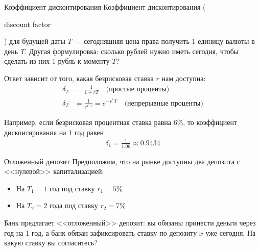 \documentclass{beamer}
\newcommand{\en}[1]{\begin{otherlanguage}{english}#1\end{otherlanguage}}
\begin{document}
\begin{frame}{Коэффициент дисконтирования}
\justify
Коэффициент дисконтирования (\en{discount factor}) для будущей даты $T$ --- сегодняшняя цена права получить 1 единицу валюты в день $T$. Другая формулировка: сколько рублей нужно иметь сегодня, чтобы сделать из них 1 рубль к моменту $T$?

\justify
Ответ зависит от того, какая безрисковая ставка $r$ нам доступна:
\begin{align*}
\delta_T &= \frac{1}{1 + rT} \quad \text{(простые проценты)} \\
\delta_T &= \frac{1}{e^{r^*T}} = e^{-r^*T} \quad \text{(непрерывные проценты)}
\end{align*}

\justify
Например, если безрисковая процентная ставка равна 6\%, то коэффициент дисконтирования на 1 год равен
\begin{align*}
\delta_1 = \frac{1}{1.06} \approx 0.9434
\end{align*}
\end{frame}



\begin{frame}{Отложенный депозит}
\justify
Предположим, что на рынке доступны два депозита с <<нулевой>> капитализацией:
\begin{itemize}
\item На $T_1=1$ год под ставку $r_1=5\%$ 
\item На $T_2=2$ года под ставку $r_2=7\%$ 
\end{itemize}

Банк предлагает <<отложенный>> депозит: вы обязаны принести деньги через год на 1 год, а банк обязан зафиксировать ставку по депозиту $x$ уже сегодня. На какую ставку вы согласитесь?

\centering
{}
\end{frame}
\end{document}
